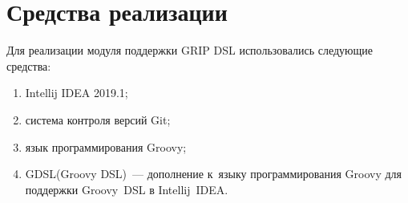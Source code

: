 \section{Средства реализации} \label{sub22}

Для реализации модуля поддержки GRIP DSL использовались следующие средства:

\begin{enumerate} 
\item{Intellij IDEA 2019.1;}	
\item{система контроля версий Git;}
\item{язык программирования Groovy;}
\item{GDSL(Groovy DSL)~--- дополнение к~языку программирования Groovy для поддержки Groovy~DSL в Intellij~IDEA.}
\end{enumerate}